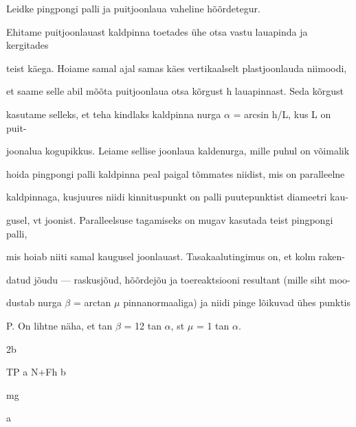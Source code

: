 
Leidke pingpongi palli ja puitjoonlaua vaheline hõõrdetegur.

\hint

\solu
Ehitame puitjoonlauast kaldpinna toetades ühe otsa vastu lauapinda ja kergitades

teist käega. Hoiame samal ajal samas käes vertikaalselt plastjoonlauda niimoodi,

et saame selle abil mõõta puitjoonlaua otsa kõrgust h lauapinnast. Seda kõrgust

kasutame selleks, et teha kindlaks kaldpinna nurga $\alpha$ = arcsin h/L, kus L on puit-

joonalua kogupikkus. Leiame sellise joonlaua kaldenurga, mille puhul on võimalik

hoida pingpongi palli kaldpinna peal paigal tõmmates niidist, mis on paralleelne

kaldpinnaga, kusjuures niidi kinnituspunkt on palli puutepunktist diameetri kau-

gusel, vt joonist. Paralleelsuse tagamiseks on mugav kasutada teist pingpongi palli,

mis hoiab niiti samal kaugusel joonlauast. Tasakaalutingimus on, et kolm raken-

datud jõudu --- raskusjõud, hõõrdejõu ja toereaktsiooni resultant (mille siht moo-

dustab nurga $\beta$ = arctan $\mu$ pinnanormaaliga) ja niidi pinge lõikuvad ühes punktis

P. On lihtne näha, et tan $\beta$ = 12 tan $\alpha$, st $\mu$ = 1 tan $\alpha$.

2b

TP a N+Fh b

mg

a
\probend

